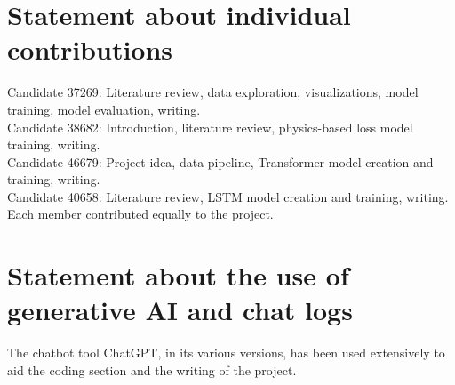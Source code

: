 \documentclass[sigconf]{acmart}
\begin{document}
\section{Statement about individual contributions}

Candidate 37269: 
Literature review, data exploration, visualizations, model training, model evaluation, writing.
\\
Candidate 38682:
Introduction, literature review, physics-based loss model training, writing.
\\
Candidate 46679:
Project idea, data pipeline, Transformer model creation and training, writing. 
\\
Candidate 40658:
Literature review, LSTM model creation and training, writing.
\\
Each member contributed equally to the project.
\\
\section{Statement about the use of generative AI and chat logs}

The chatbot tool ChatGPT, in its various versions, has been used extensively to aid the coding section and the writing of the project.
\end{document}
